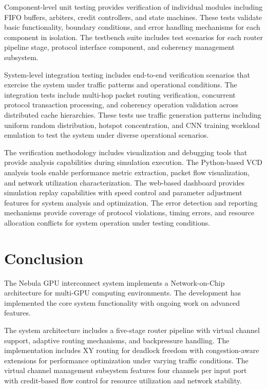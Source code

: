 \documentclass[12pt,letterpaper]{article}
\begin{document}
Component-level unit testing provides verification of individual modules including FIFO buffers, arbiters, credit controllers, and state machines. These tests validate basic functionality, boundary conditions, and error handling mechanisms for each component in isolation. The testbench suite includes test scenarios for each router pipeline stage, protocol interface component, and coherency management subsystem.

System-level integration testing includes end-to-end verification scenarios that exercise the system under traffic patterns and operational conditions. The integration tests include multi-hop packet routing verification, concurrent protocol transaction processing, and coherency operation validation across distributed cache hierarchies. These tests use traffic generation patterns including uniform random distribution, hotspot concentration, and CNN training workload emulation to test the system under diverse operational scenarios.

The verification methodology includes visualization and debugging tools that provide analysis capabilities during simulation execution. The Python-based VCD analysis tools enable performance metric extraction, packet flow visualization, and network utilization characterization. The web-based dashboard provides simulation replay capabilities with speed control and parameter adjustment features for system analysis and optimization. The error detection and reporting mechanisms provide coverage of protocol violations, timing errors, and resource allocation conflicts for system operation under testing conditions.

\section{Conclusion}

The Nebula GPU interconnect system implements a Network-on-Chip architecture for multi-GPU computing environments. The development has implemented the core system functionality with ongoing work on advanced features.

The system architecture includes a five-stage router pipeline with virtual channel support, adaptive routing mechanisms, and backpressure handling. The implementation includes XY routing for deadlock freedom with congestion-aware extensions for performance optimization under varying traffic conditions. The virtual channel management subsystem features four channels per input port with credit-based flow control for resource utilization and network stability.
\end{document}
